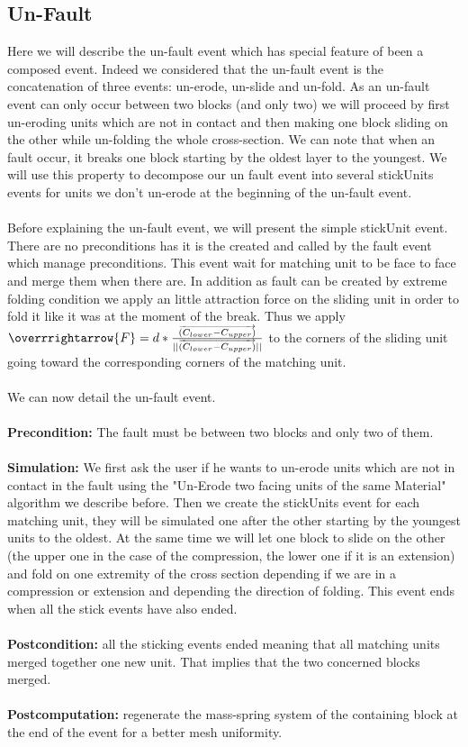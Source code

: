 \documentclass[12pt, a4paper]{memoir} %
\begin{document}
\subsection{Un-Fault}

Here we will describe the un-fault event which has special feature of been a composed event. Indeed we considered that the un-fault event is the concatenation of three events: un-erode, un-slide and un-fold. As an un-fault event can only occur between two blocks (and only two) we will proceed by first un-eroding units which are not in contact and then making one block sliding on the other while un-folding the whole cross-section. We can note that when an fault occur, it breaks one block starting by the oldest layer to the youngest. We will use this property to decompose our un fault event into several stickUnits events for units we don't un-erode at the beginning of the un-fault event.\\\\
Before explaining the un-fault event, we will present the simple stickUnit event. There are no preconditions has it is the created and called by the fault event which manage preconditions. This event wait for matching unit to be face to face and merge them when there are. In addition as fault can be created by extreme folding condition we apply an little attraction force on the sliding unit in order to fold it like it was at the moment of the break. Thus we apply $\overrrightarrow{F} = d*\frac{\overrightarrow{(C_{lower} - C_{upper})} }{||\overrightarrow{(C_{lower} - C_{upper})}||}$ to the corners of the sliding unit going toward the corresponding corners of the matching unit.\\\\
We can now detail the un-fault event.\\\\
\textbf{Precondition:} The fault must be between two blocks and only two of them.\\\\
\textbf{Simulation:} We first ask the user if he wants to un-erode units which are not in contact in the fault using the "Un-Erode two facing units of the same Material" algorithm we describe before. Then we create the stickUnits event for each matching unit, they will be simulated one after the other starting by the youngest units to the oldest. At the same time we will let one block to slide on the other (the upper one in the case of the compression, the lower one if it is an extension) and fold on one extremity of the cross section depending if we are in a compression or extension and depending the direction of folding. This event ends when all the stick events have also ended.\\\\
\textbf{Postcondition:} all the sticking events ended meaning that all matching units merged together one new unit. That implies that the two concerned blocks merged.\\\\
\textbf{Postcomputation:} regenerate the mass-spring system of the containing block at the end of the event for a better mesh uniformity.\\\\ 
		
\end{document}
